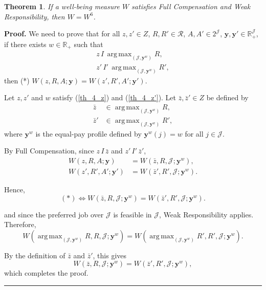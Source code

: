 \documentclass[12pt,thmsb]{article}
\DeclareMathOperator*{\argmax}{arg\,max}
\newtheorem{theorem}{Theorem}
\newenvironment{proof}[1][Proof]{\noindent \textbf{#1.} }{\  \rule{0.5em}{0.5em}}
\begin{document}
\begin{theorem}
If a well-being measure $W$ satisfies Full Compensation and Weak Responsibility, then $W=W^6$.
\end{theorem}

\begin{proof}
We need to prove that for all $z,z'\in Z$, $R,R'\in\mathcal{R}$, $A,A'\in 2^{\mathcal{J}}$, $\mathbf y,\mathbf y'\in\mathbb{R}_{+}^{\mathcal{J}}$, if there exists $w\in\mathbb{R}_{+}$ such that
\begin{align}
z\,I\,\argmax_{(\mathcal{J},\mathbf{y}^w)}R, \label{th_4_z}\\
z'\,I'\,\argmax_{(\mathcal{J},\mathbf{y}^w)}R', \label{th_4_z'}
\end{align}
then (*) $W(z,R,A;\mathbf{y})=W(z',R',A';\mathbf{y}')$.

Let $z,z'$ and $w$ satisfy (\ref{th_4_z}) and (\ref{th_4_z'}). Let $\bar z,\bar z'\in Z$ be defined by
\begin{align*}
\bar z &\in \argmax_{(\mathcal{J},\mathbf y^w)}R,\\
\bar z' &\in \argmax_{(\mathcal{J},\mathbf y^w)}R',
\end{align*}
where $\mathbf y^w$ is the equal-pay profile defined by $\mathbf y^w(j)=w$ for all $j\in\mathcal J$.

By Full Compensation, since $z\,I\,\bar z$ and $z'\,I'\,\bar z'$,
\begin{align*}
W(z,R,A;\mathbf y)
&=W(\bar z,R,\mathcal J;\mathbf y^w),\\
W(z',R',A';\mathbf y')
&=W(\bar z',R',\mathcal J;\mathbf y^w).
\end{align*}

Hence,
\begin{equation*}
(*)\Leftrightarrow
W(\bar z,R,\mathcal J;\mathbf y^w)
=
W(\bar z',R',\mathcal J;\mathbf y^w).
\end{equation*}

and since the preferred job over $\mathcal J$ is feasible in $\mathcal J$, Weak Responsibility applies. Therefore,
\begin{equation*}
W(\argmax_{(\mathcal J,\mathbf y^w)}R,R,\mathcal J;\mathbf y^w)
=
W(\argmax_{(\mathcal J,\mathbf y^w)}R',R',\mathcal J;\mathbf y^w).
\end{equation*}

By the definition of $\bar z$ and $\bar z'$, this gives
\begin{equation*}
W(\bar z,R,\mathcal J;\mathbf y^w)
=
W(\bar z',R',\mathcal J;\mathbf y^w),
\end{equation*}
which completes the proof.
\end{proof}
\end{document}
